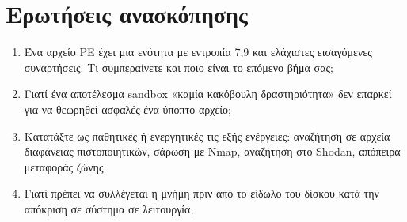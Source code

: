 \section*{Ερωτήσεις ανασκόπησης}
\begin{enumerate}
  \item Ένα αρχείο PE έχει μια ενότητα με εντροπία 7,9 και ελάχιστες εισαγόμενες συναρτήσεις. Τι συμπεραίνετε και ποιο είναι το επόμενο βήμα σας;
  \item Γιατί ένα αποτέλεσμα sandbox «καμία κακόβουλη δραστηριότητα» δεν επαρκεί για να θεωρηθεί ασφαλές ένα ύποπτο αρχείο;
  \item Κατατάξτε ως παθητικές ή ενεργητικές τις εξής ενέργειες: αναζήτηση σε αρχεία διαφάνειας πιστοποιητικών, σάρωση με Nmap, αναζήτηση στο Shodan, απόπειρα μεταφοράς ζώνης.
  \item Γιατί πρέπει να συλλέγεται η μνήμη πριν από το είδωλο του δίσκου κατά την απόκριση σε σύστημα σε λειτουργία;
\end{enumerate}
